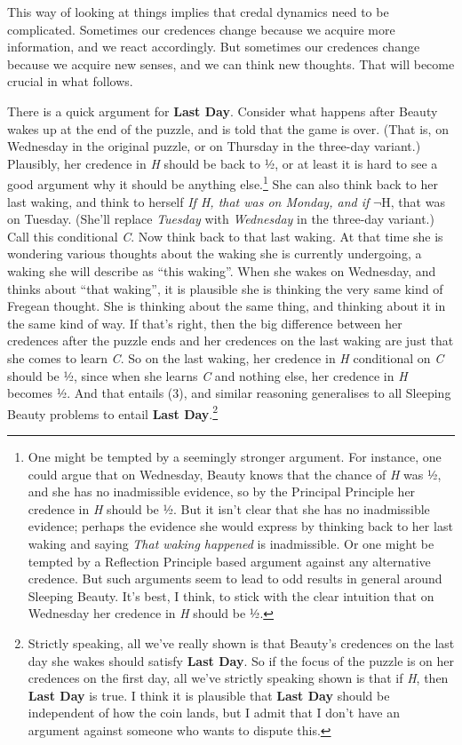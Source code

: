 \documentclass[
  10pt,
  letterpaper,
  DIV=11,
  numbers=noendperiod,
  twoside]{scrartcl}
\begin{document}
This way of looking at things implies that credal dynamics need to be
complicated. Sometimes our credences change because we acquire more
information, and we react accordingly. But sometimes our credences
change because we acquire new senses, and we can think new thoughts.
That will become crucial in what follows.

There is a quick argument for \textbf{Last Day}. Consider what happens
after Beauty wakes up at the end of the puzzle, and is told that the
game is over. (That is, on Wednesday in the original puzzle, or on
Thursday in the three-day variant.) Plausibly, her credence in \emph{H}
should be back to ½, or at least it is hard to see a good argument why
it should be anything else.\footnote{One might be tempted by a seemingly
  stronger argument. For instance, one could argue that on Wednesday,
  Beauty knows that the chance of \emph{H} was ½, and she has no
  inadmissible evidence, so by the Principal Principle her credence in
  \emph{H} should be ½. But it isn't clear that she has no inadmissible
  evidence; perhaps the evidence she would express by thinking back to
  her last waking and saying \emph{That waking happened} is
  inadmissible. Or one might be tempted by a Reflection Principle based
  argument against any alternative credence. But such arguments seem to
  lead to odd results in general around Sleeping Beauty. It's best, I
  think, to stick with the clear intuition that on Wednesday her
  credence in \emph{H} should be ½.} She can also think back to her last
waking, and think to herself \emph{If H, that was on Monday, and if}
\(¬\)H, that was on Tuesday. (She'll replace \emph{Tuesday} with
\emph{Wednesday} in the three-day variant.) Call this conditional
\emph{C}. Now think back to that last waking. At that time she is
wondering various thoughts about the waking she is currently undergoing,
a waking she will describe as ``this waking''. When she wakes on
Wednesday, and thinks about ``that waking'', it is plausible she is
thinking the very same kind of Fregean thought. She is thinking about
the same thing, and thinking about it in the same kind of way. If that's
right, then the big difference between her credences after the puzzle
ends and her credences on the last waking are just that she comes to
learn \emph{C}. So on the last waking, her credence in \emph{H}
conditional on \emph{C} should be ½, since when she learns \emph{C} and
nothing else, her credence in \emph{H} becomes ½. And that entails (3),
and similar reasoning generalises to all Sleeping Beauty problems to
entail \textbf{Last Day}.\footnote{Strictly speaking, all we've really
  shown is that Beauty's credences on the last day she wakes should
  satisfy \textbf{Last Day}. So if the focus of the puzzle is on her
  credences on the first day, all we've strictly speaking shown is that
  if \emph{H}, then \textbf{Last Day} is true. I think it is plausible
  that \textbf{Last Day} should be independent of how the coin lands,
  but I admit that I don't have an argument against someone who wants to
  dispute this.}
\end{document}
